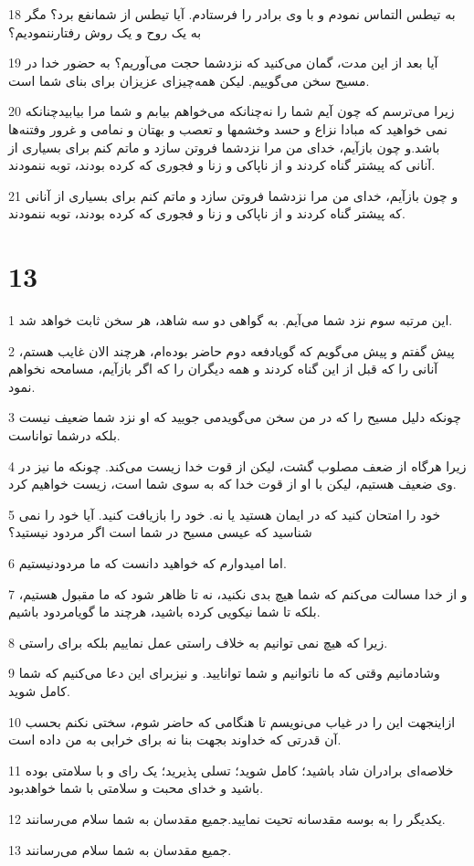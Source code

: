 \par 18 به تیطس التماس نمودم و با وی برادر را فرستادم. آیا تیطس از شمانفع برد؟ مگر به یک روح و یک روش رفتارننمودیم؟
\par 19 آیا بعد از این مدت، گمان می‌کنید که نزدشما حجت می‌آوریم؟ به حضور خدا در مسیح سخن می‌گوییم. لیکن همه‌چیز‌ای عزیزان برای بنای شما است.
\par 20 زیرا می‌ترسم که چون آیم شما را نه‌چنانکه می‌خواهم بیابم و شما مرا بیابیدچنانکه نمی خواهید که مبادا نزاع و حسد وخشمها و تعصب و بهتان و نمامی و غرور وفتنه‌ها باشد.و چون بازآیم، خدای من مرا نزدشما فروتن سازد و ماتم کنم برای بسیاری از آنانی که پیشتر گناه کردند و از ناپاکی و زنا و فجوری که کرده بودند، توبه ننمودند.
\par 21 و چون بازآیم، خدای من مرا نزدشما فروتن سازد و ماتم کنم برای بسیاری از آنانی که پیشتر گناه کردند و از ناپاکی و زنا و فجوری که کرده بودند، توبه ننمودند.

\chapter{13}

\par 1 این مرتبه سوم نزد شما می‌آیم. به گواهی دو سه شاهد، هر سخن ثابت خواهد شد.
\par 2 پیش گفتم و پیش می‌گویم که گویادفعه دوم حاضر بوده‌ام، هرچند الان غایب هستم، آنانی را که قبل از این گناه کردند و همه دیگران را که اگر بازآیم، مسامحه نخواهم نمود.
\par 3 چونکه دلیل مسیح را که در من سخن می‌گویدمی جویید که او نزد شما ضعیف نیست بلکه درشما تواناست.
\par 4 زیرا هرگاه از ضعف مصلوب گشت، لیکن از قوت خدا زیست می‌کند. چونکه ما نیز در وی ضعیف هستیم، لیکن با او از قوت خدا که به سوی شما است، زیست خواهیم کرد.
\par 5 خود را امتحان کنید که در ایمان هستید یا نه. خود را باز‌یافت کنید. آیا خود را نمی شناسید که عیسی مسیح در شما است اگر مردود نیستید؟
\par 6 اما امیدوارم که خواهید دانست که ما مردودنیستیم.
\par 7 و از خدا مسالت می‌کنم که شما هیچ بدی نکنید، نه تا ظاهر شود که ما مقبول هستیم، بلکه تا شما نیکویی کرده باشید، هرچند ما گویامردود باشیم.
\par 8 زیرا که هیچ نمی توانیم به خلاف راستی عمل نماییم بلکه برای راستی.
\par 9 وشادمانیم وقتی که ما ناتوانیم و شما توانایید. و نیزبرای این دعا می‌کنیم که شما کامل شوید.
\par 10 ازاینجهت این را در غیاب می‌نویسم تا هنگامی که حاضر شوم، سختی نکنم بحسب آن قدرتی که خداوند بجهت بنا نه برای خرابی به من داده است.
\par 11 خلاصه‌ای برادران شاد باشید؛ کامل شوید؛ تسلی پذیرید؛ یک رای و با سلامتی بوده باشید و خدای محبت و سلامتی با شما خواهدبود.
\par 12 یکدیگر را به بوسه مقدسانه تحیت نمایید.جمیع مقدسان به شما سلام می‌رسانند.
\par 13 جمیع مقدسان به شما سلام می‌رسانند.



